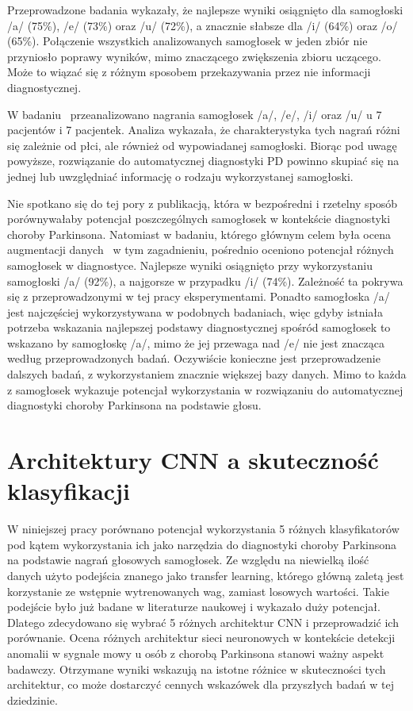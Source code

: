 Przeprowadzone badania wykazały, że najlepsze wyniki osiągnięto dla samogłoski /a/ (75\%), /e/ (73\%) oraz /u/ (72\%), a znacznie słabsze dla /i/ (64\%) oraz /o/ (65\%).
Połączenie wszystkich analizowanych samogłosek w jeden zbiór nie przyniosło poprawy wyników, mimo znaczącego zwiększenia zbioru uczącego.
Może to wiązać się z różnym sposobem przekazywania przez nie informacji diagnostycznej.

W badaniu~\cite{vowels-in-PD} przeanalizowano nagrania samogłosek /a/, /e/, /i/ oraz /u/ u 7 pacjentów i 7 pacjentek.
Analiza wykazała, że charakterystyka tych nagrań różni się zależnie od płci, ale również od wypowiadanej samogłoski.
Biorąc pod uwagę powyższe, rozwiązanie do automatycznej diagnostyki PD powinno skupiać się na jednej lub uwzględniać informację o rodzaju wykorzystanej samogłoski.

Nie spotkano się do tej pory z publikacją, która w bezpośredni i rzetelny sposób porównywałaby potencjał poszczególnych samogłosek w kontekście diagnostyki choroby Parkinsona.
Natomiast w badaniu, którego głównym celem była ocena augmentacji danych~\cite{augmentation} w tym zagadnieniu, pośrednio oceniono potencjał różnych samogłosek w diagnostyce.
Najlepsze wyniki osiągnięto przy wykorzystaniu samogłoski /a/ (92\%), a najgorsze w przypadku /i/ (74\%).
Zależność ta pokrywa się z przeprowadzonymi w tej pracy eksperymentami.
Ponadto samogłoska /a/ jest najczęściej wykorzystywana w podobnych badaniach, więc gdyby istniała potrzeba wskazania najlepszej podstawy diagnostycznej spośród samogłosek to wskazano by samogłoskę /a/, mimo że jej przewaga nad /e/ nie jest znacząca według przeprowadzonych badań.
Oczywiście konieczne jest przeprowadzenie dalszych badań, z wykorzystaniem znacznie większej bazy danych.
Mimo to każda z samogłosek wykazuje potencjał wykorzystania w rozwiązaniu do automatycznej diagnostyki choroby Parkinsona na podstawie głosu.

\section{Architektury CNN a skuteczność klasyfikacji\@}
\label{sec:CNN-a-skutecznosc-klasyfikacji}
W niniejszej pracy porównano potencjał wykorzystania 5 różnych klasyfikatorów pod kątem wykorzystania ich jako narzędzia do diagnostyki choroby Parkinsona na podstawie nagrań głosowych samogłosek.
Ze względu na niewielką ilość danych użyto podejścia znanego jako transfer learning, którego główną zaletą jest korzystanie ze wstępnie wytrenowanych wag, zamiast losowych wartości.
Takie podejście było już badane w literaturze naukowej i wykazało duży potencjał.
Dlatego zdecydowano się wybrać 5 różnych architektur CNN i przeprowadzić ich porównanie.
Ocena różnych architektur sieci neuronowych w kontekście detekcji anomalii w sygnale mowy u osób z chorobą Parkinsona stanowi ważny aspekt badawczy.
Otrzymane wyniki wskazują na istotne różnice w skuteczności tych architektur, co może dostarczyć cennych wskazówek dla przyszłych badań w tej dziedzinie.

